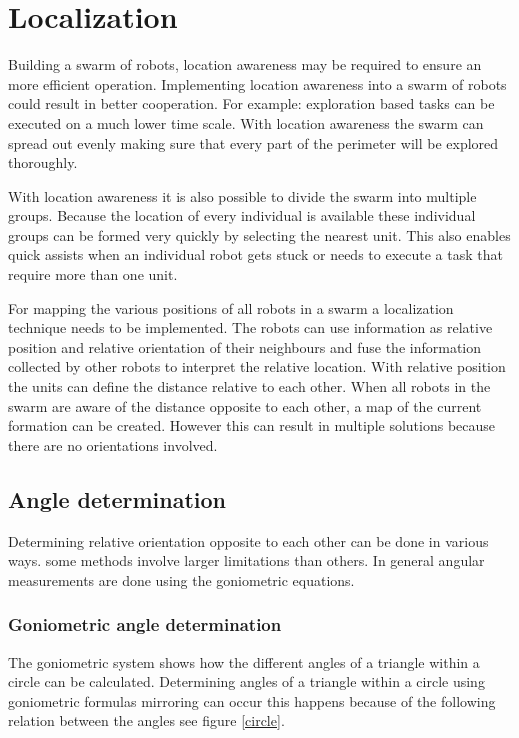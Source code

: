 \documentclass[10pt,a4paper]{article}
\begin{document}
\newpage
\section{Localization}
Building a swarm of robots, location awareness may be required to ensure an more efficient operation. Implementing location awareness into a swarm of robots could result in better cooperation. For example: exploration based tasks can be executed on a much lower time scale. With location awareness the swarm can spread out evenly making sure that every part of the perimeter will be explored thoroughly. 

With location awareness it is also possible to divide the swarm into multiple groups. Because the location of every individual is available these individual groups can be formed very quickly by selecting the nearest unit. This also enables quick assists when an individual robot gets stuck or needs to execute a task that require more than one unit.

For mapping the various positions of all robots in a swarm a localization technique needs to be implemented. The robots can use information as relative position and relative orientation of their neighbours and fuse the information collected by other robots to interpret the relative location. With relative position the units can define the distance relative to each other. When all robots in the swarm are aware of the distance opposite to each other, a map of the current formation can be created. However this can result in multiple solutions because there are no orientations involved. 

\subsection{Angle determination}
Determining relative orientation opposite to each other can be done in various ways. some methods involve larger limitations than others. In general angular measurements are done using the goniometric equations.

\subsubsection{Goniometric angle determination}
The goniometric system shows how the different angles of a triangle within a circle can be calculated. Determining angles of a triangle within a circle using goniometric formulas mirroring can occur this happens because of the following relation between the angles see figure \ref{circle}.
\end{document}
